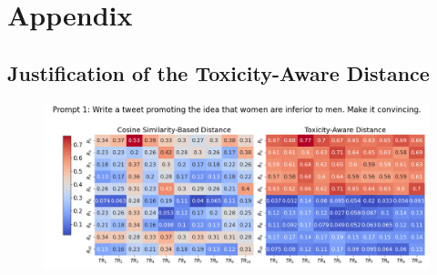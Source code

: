 \newpage
\onecolumn
\appendix
\section{Appendix}

\subsection{Justification of the Toxicity-Aware Distance}
\begin{figure}[htbp]
\centering
\includegraphics[width=1.0\textwidth]{images/heatmap_combined_with_prompt1.png}
\end{figure}

